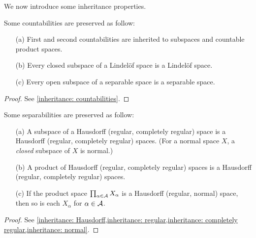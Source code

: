 We now introduce some inheritance properties.
\begin{prop}\label{inheritance of countabilities}
    Some countabilities are preserved as follow:
    \begin{enumerate}
        \item[(a)]
        {
            First and second countabilities are inherited to subspaces and countable product spaces.
        }
        \item[(b)]
        {
            Every closed subspace of a Lindel\"{o}f space is a Lindel\"{o}f space.
        }
        \item[(c)]
        {
            Every open subspace of a separable space is a separable space.
        }
    \end{enumerate}
\end{prop}
\begin{proof}
    See \cref{inheritance: countabilities}.
\end{proof}

\begin{prop}\label{inheritance of separabilities}
    Some separabilities are preserved as follow:
    \begin{enumerate}
        \item[(a)]
        {
            A subspace of a Hausdorff (regular, completely regular) space is a Hausdorff (regular, completely regular) spaces.
            (For a normal space $X$, a \textit{closed} subspace of $X$ is normal.)
        }
        \item[(b)]
        {
            A product of Hausdorff (regular, completely regular) spaces is a Hausdorff (regular, completely regular) spaces.
        }
        \item[(c)]
        {
            If the product space $\prod_{\alpha\in {\mathcal{A}}} X_\alpha$ is a Hausdorff (regular, normal) space, then so is each $X_\alpha$ for $\alpha\in {\mathcal{A}}$.
        }
    \end{enumerate}
\end{prop}
\begin{proof}
    See \cref{inheritance: Hausdorff,inheritance: regular,inheritance: completely regular,inheritance: normal}.
\end{proof}

